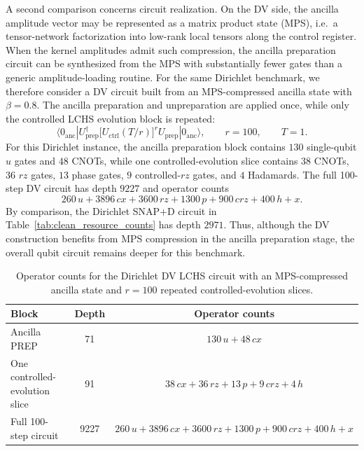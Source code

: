 A second comparison concerns circuit realization. On the DV side, the ancilla amplitude vector may be represented as a matrix product state (MPS), i.e.\ a tensor-network factorization into low-rank local tensors along the control register. When the kernel amplitudes admit such compression, the ancilla preparation circuit can be synthesized from the MPS with substantially fewer gates than a generic amplitude-loading routine. For the same Dirichlet benchmark, we therefore consider a DV circuit built from an MPS-compressed ancilla state with $\beta=0.8$. The ancilla preparation and unpreparation are applied once, while only the controlled LCHS evolution block is repeated:
\[
\langle 0_{\mathrm{anc}}|
U_{\mathrm{prep}}^\dagger
\bigl[U_{\mathrm{ctrl}}(T/r)\bigr]^r
U_{\mathrm{prep}}
|0_{\mathrm{anc}}\rangle,
\qquad r=100,
\qquad T=1.
\]
For this Dirichlet instance, the ancilla preparation block contains $130$ single-qubit $u$ gates and $48$ CNOTs, while one controlled-evolution slice contains $38$ CNOTs, $36$ $rz$ gates, $13$ phase gates, $9$ controlled-$rz$ gates, and $4$ Hadamards. The full 100-step DV circuit has depth $9227$ and operator counts
\[
260\,u + 3896\,cx + 3600\,rz + 1300\,p + 900\,crz + 400\,h + x.
\]
By comparison, the Dirichlet SNAP$+$D circuit in Table~\ref{tab:clean_resource_counts} has depth $2971$. Thus, although the DV construction benefits from MPS compression in the ancilla preparation stage, the overall qubit circuit remains deeper for this benchmark.

\begin{table}[t]
\centering
{\small
\caption{Operator counts for the Dirichlet DV LCHS circuit with an MPS-compressed ancilla state and $r=100$ repeated controlled-evolution slices.}
\label{tab:dv_circuit_compare}
\begin{tabular}{lcc}
\toprule
Block & Depth & Operator counts \\
\midrule
Ancilla PREP & 71 & $130\,u + 48\,cx$ \\
One controlled-evolution slice & 91 & $38\,cx + 36\,rz + 13\,p + 9\,crz + 4\,h$ \\
Full 100-step circuit & 9227 & $260\,u + 3896\,cx + 3600\,rz + 1300\,p + 900\,crz + 400\,h + x$ \\
\bottomrule
\end{tabular}}
\end{table}

